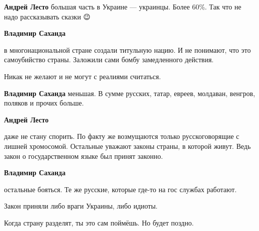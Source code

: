 \begin{itemize}
\begin{itemize}
\textbf{Андрей Лесто} большая часть в Украине — украинцы. Более 60\%. Так что не надо рассказывать сказки 😉

 
\textbf{Владимир Саханда} 

в многонациональной стране создали титульную нацию. И не понимают, что это
самоубийство страны. Заложили сами бомбу замедленного действия.

Никак не желают и не могут с реалиями считаться.


 
\textbf{Владимир Саханда} меньшая. В сумме русских, татар, евреев, молдаван, венгров, поляков и прочих больше.

 
\textbf{Андрей Лесто} 

даже не стану спорить. По факту же возмущаются только русскоговорящие с лишней
хромосомой. Остальные уважают законы страны, в которой живут. Ведь закон о
государственном языке был принят законно.

 
\textbf{Владимир Саханда} 

остальные бояться. Те же русские, которые где-то на гос службах работают.

Закон приняли либо враги Украины, либо идиоты.

Когда страну разделят, ты это сам поймёшь. Но будет поздно.

 

\end{itemize}
\end{itemize}
